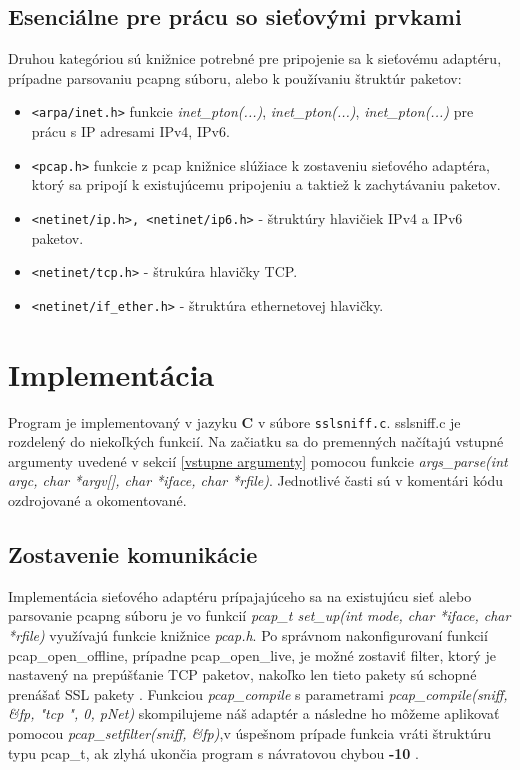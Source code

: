 \documentclass[11pt, a4paper]{article}
\begin{document}
	\subsection{Esenciálne pre prácu so sieťovými prvkami}
	Druhou kategóriou sú knižnice potrebné pre pripojenie sa k sieťovému adaptéru, prípadne parsovaniu pcapng súboru, alebo k používaniu štruktúr paketov:
	\begin{itemize}
	\item \texttt{<arpa/inet.h>} funkcie \emph{inet\_pton(...)}, \emph{inet\_pton(...)}, \emph{inet\_pton(...)} pre prácu s IP adresami IPv4, IPv6.
	\item \texttt{<pcap.h>} funkcie z pcap knižnice slúžiace k zostaveniu sieťového adaptéra, ktorý sa pripojí k existujúcemu pripojeniu a taktiež k zachytávaniu paketov.
	\item \texttt{<netinet/ip.h>, <netinet/ip6.h>} - štruktúry hlavičiek IPv4 a IPv6 paketov.
	\item \texttt{<netinet/tcp.h>} - štrukúra hlavičky TCP.
	\item \texttt{<netinet/if\_ether.h>} - štruktúra ethernetovej hlavičky.
	\end{itemize}

	
	
	\newpage
	\section{Implementácia}
	
	Program je implementovaný v jazyku \textbf{C} v súbore \texttt{sslsniff.c}.  
	sslsniff.c je rozdelený do niekoľkých funkcií. Na začiatku sa do premenných načítajú vstupné argumenty uvedené v sekcií \ref{vstupne argumenty} pomocou funkcie \emph{args\_parse(int argc, char *argv[], char *iface, char *rfile)}. 
Jednotlivé časti sú v komentári kódu ozdrojované a okomentované.
	
	\subsection{Zostavenie komunikácie}
	
	Implementácia sieťového adaptéru prípajajúceho sa na existujúcu sieť alebo parsovanie pcapng súboru je vo funkcií  \emph{pcap\_t set\_up(int mode, char *iface, char *rfile)} využívajú funkcie knižnice \emph{pcap.h}. Po správnom nakonfigurovaní funkcií pcap\_open\_offline, prípadne pcap\_open\_live, je možné zostaviť filter, ktorý je nastavený na prepúšťanie TCP paketov, nakoľko len tieto pakety sú schopné prenášať SSL pakety \cite{prednaskaZabezpeceni}. Funkciou \emph{pcap\_compile} s parametrami \emph{pcap\_compile(sniff, \&fp, "tcp ", 0, pNet)} skompilujeme náš adaptér a následne ho môžeme aplikovať pomocou \emph{pcap\_setfilter(sniff, \&fp)},v úspešnom prípade funkcia vráti štruktúru typu pcap\_t,  ak zlyhá ukončia program s návratovou chybou \textbf{-10} \cite{Tcpdump}. 
	
\end{document}
